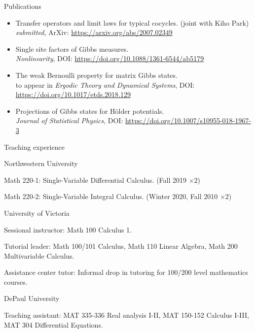 \documentclass{resume} %
\begin{document}
\begin{rSection}{Publications}
	\begin{itemize}
		\item 
		Transfer operators and limit laws for typical cocycles. (joint with Kiho Park)\\
		\emph{submitted}, ArXiv: \href{https://arxiv.org/abs/2007.02349}{\small{https://arxiv.org/abs/2007.02349}}
		
		\item 
		Single site factors of Gibbs measures.\\
		\emph{Nonlinearity}, DOI: \href{https://doi.org/10.1088/1361-6544/ab5179}{\small{https://doi.org/10.1088/1361-6544/ab5179}}
		
		\item 
		The weak Bernoulli property for matrix Gibbs states.\\
		to appear in \emph{Ergodic Theory and Dynamical Systems}, DOI: \href{https://doi.org/10.1017/etds.2018.129}{\small{https://doi.org/10.1017/etds.2018.129}}
		
		\item 
		Projections of Gibbs states for H\"older potentials.\\
		\emph{Journal of Statistical Physics}, DOI: \href{https://doi.org/10.1007/s10955-018-1967-3}{\small{https://doi.org/10.1007/s10955-018-1967-3}}
	\end{itemize}
\end{rSection}

\begin{rSection}{Teaching experience}
	\begin{rSubsection}{Northwestern University}{}{}{}
		\item
		Math 220-1: Single-Variable Differential Calculus. (Fall 2019 $\times 2$)
		
		\item
		Math 220-2: Single-Variable Integral Calculus. (Winter 2020, Fall 2010 $\times 2$)
		
	\end{rSubsection}
	
	\begin{rSubsection}{University of Victoria}{}{}{}
		\item 
		Sessional instructor: Math 100 Calculus 1.
		
		\item 
		Tutorial leader: Math 100/101 Calculus, Math 110 Linear Algebra, Math 200 Multivariable Calculus.
		
		\item 
		Assistance center tutor: Informal drop in tutoring for 100/200 level mathematics courses.
	\end{rSubsection}
	
	\begin{rSubsection}{DePaul University}{}{}{}
		\item
		Teaching assistant: MAT 335-336 Real analysis I-II, MAT 150-152 Calculus I-III, MAT 304 Differential Equations.
	\end{rSubsection}
	
\end{rSection}
\end{document}
